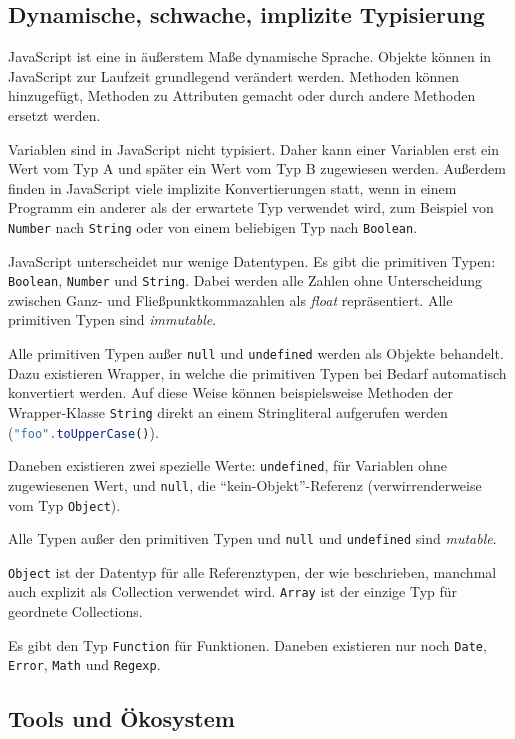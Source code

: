 \documentclass[a4paper, 12pt, hidelinks, listof=totoc, listoftables=totoc, bibliography=totoc]{scrreprt}
\begin{document}
\subsection{Dynamische, schwache, implizite Typisierung}

JavaScript ist eine in äußerstem Maße dynamische Sprache. Objekte können in JavaScript zur Laufzeit grundlegend verändert werden. Methoden können hinzugefügt, Methoden zu Attributen gemacht oder durch andere Methoden ersetzt werden.

Variablen sind in JavaScript nicht typisiert. Daher kann einer Variablen erst ein Wert vom Typ A und später ein Wert vom Typ B zugewiesen werden. Außerdem finden in JavaScript viele implizite Konvertierungen statt, wenn in einem Programm ein anderer als der erwartete Typ verwendet wird, zum Beispiel von \texttt{Number} nach \texttt{String} oder von einem beliebigen Typ nach \texttt{Boolean}.

JavaScript unterscheidet nur wenige Datentypen. Es gibt die primitiven Typen: \texttt{Boolean}, \texttt{Number} und \texttt{String}. 
Dabei werden alle Zahlen ohne Unterscheidung zwischen Ganz- und Fließpunktkommazahlen als \textit{float} repräsentiert. Alle primitiven Typen sind \textit{immutable}.

Alle primitiven Typen außer \texttt{null} und \texttt{undefined} werden als Objekte behandelt. Dazu existieren Wrapper, in welche die primitiven Typen bei Bedarf automatisch konvertiert werden. Auf diese Weise können beispielsweise Methoden der Wrapper-Klasse \texttt{String} direkt an einem Stringliteral aufgerufen werden (\lstinline[language=JavaScript, style=inline]|"foo".toUpperCase()|).

Daneben existieren zwei spezielle Werte: \texttt{undefined}, für Variablen ohne zugewiesenen Wert, und \texttt{null}, die "`kein-Objekt"'-Referenz (verwirrenderweise vom Typ \texttt{Object}).

Alle Typen außer den primitiven Typen und \texttt{null} und \texttt{undefined} sind \textit{mutable}.

\texttt{Object} ist der Datentyp für alle Referenztypen, der wie beschrieben, manchmal auch explizit als Collection verwendet wird. \texttt{Array} ist der einzige Typ für geordnete Collections.

Es gibt den Typ \texttt{Function} für Funktionen. Daneben existieren nur noch \texttt{Date}, \texttt{Error}, \texttt{Math} und \texttt{Regexp}.
\cite[S. 29 ff.]{flanagan2011.JDG}

\subsection{Tools und Ökosystem}
\end{document}
